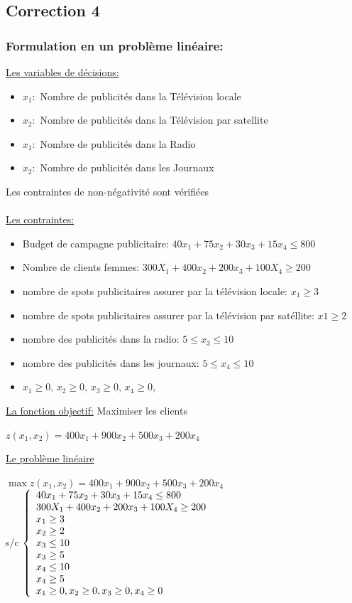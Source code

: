 \documentclass[]{book}
\begin{document}
\subsection*{Correction 4}
\subsubsection{Formulation en un problème linéaire:}
\underline{Les variables de décisions:}
\begin{itemize}
    \item $x_1:$ Nombre de publicités dans la Télévision locale
    \item $x_2:$ Nombre de publicités dans la Télévision par satellite
    \item $x_1:$ Nombre de publicités dans la Radio
    \item $x_2:$ Nombre de publicités dans les Journaux
\end{itemize}
Les contraintes de non-négativité sont vérifiées\\\\
\underline{Les contraintes:}
\begin{itemize}
    \item Budget de campagne publicitaire: $40 x_1 + 75 x_2 + 30 x_3 + 15 x_4 \leq 800$
    \item Nombre de clients femmes: $300 X_1 + 400 x_2 + 200 x_3 + 100 X_4 \geq 200$
    \item nombre de spots publicitaires assurer par la télévision locale: $x_1 \geq 3$
    \item nombre de spots publicitaires assurer par la télévision par satéllite: $x1 \geq 2$
    \item nombre des publicités dans la radio: $ 5 \leq x_3 \leq 10 $
    \item nombre des publicités dans les journaux: $ 5 \leq x_4 \leq 10 $
    \item $x_1 \geq 0$, $x_2 \geq 0$, $x_3 \geq 0$, $x_4 \geq 0$, 
\end{itemize}
\underline{La fonction objectif:}
Maximiser les clients
\begin{center}
    $z(x_1,x_2) = 400 x_1 + 900 x_2 + 500 x_3 + 200 x_4$
\end{center}
\underline{Le problème linéaire}
\begin{center}
    $\max z(x_1,x_2) = 400 x_1 + 900 x_2 + 500 x_3 + 200 x_4$\\
s/c $\left\{
	\begin{array}l
	40 x_1 + 75 x_2 + 30 x_3 + 15 x_4 \leq 800\\
    300 X_1 + 400 x_2 + 200 x_3 + 100 X_4 \geq 200\\
    x_1 \geq 3 \\
    x_2 \geq 2 \\
    x_3 \leq 10 \\
    x_3 \geq 5 \\
    x_4 \leq 10 \\
    x_4 \geq 5 \\
    x_1 \geq 0, x_2 \geq 0, x_3 \geq 0, x_4 \geq 0\end{array}
	\right.$
\end{center} 
\end{document}
